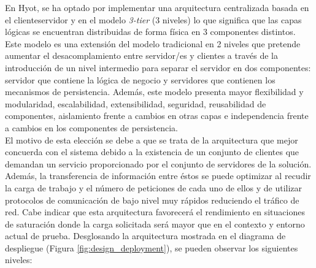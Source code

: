 \documentclass[12pt,a4paper, twoside]{report}
\begin{document}
	En Hyot, se ha optado por implementar una arquitectura centralizada basada en el \gls{clienteservidor} y en el modelo \textit{3-tier} (3 niveles) lo que significa que las capas lógicas se encuentran distribuidas de forma física en 3 componentes distintos. Este modelo es una extensión del modelo tradicional en 2 niveles que pretende aumentar el desacomplamiento entre servidor/es y clientes a través de la introducción de un nivel intermedio para separar el servidor en dos componentes: servidor que contiene la lógica de negocio y servidores que contienen los mecanismos de persistencia. Además, este modelo presenta mayor flexibilidad y modularidad, escalabilidad, extensibilidad, seguridad, reusabilidad de componentes, aislamiento frente a cambios en otras capas e independencia frente a cambios en los componentes de persistencia. \\
	
	El motivo de esta elección se debe a que se trata de la arquitectura que mejor concuerda con el sistema debido a la existencia de un conjunto de clientes que demandan un servicio proporcionado por el conjunto de servidores de la solución. Además, la transferencia de información entre éstos se puede optimizar al recudir la carga de trabajo y el número de peticiones de cada uno de ellos y de utilizar protocolos de comunicación de bajo nivel muy rápidos reduciendo el tráfico de red. Cabe indicar que esta arquitectura favorecerá el rendimiento en situaciones de saturación donde la carga solicitada será mayor que en el contexto y entorno actual de prueba. Desglosando la arquitectura mostrada en el diagrama de despliegue (Figura \ref{fig:design_deployment}), se pueden observar los siguientes niveles:
	
\end{document}
